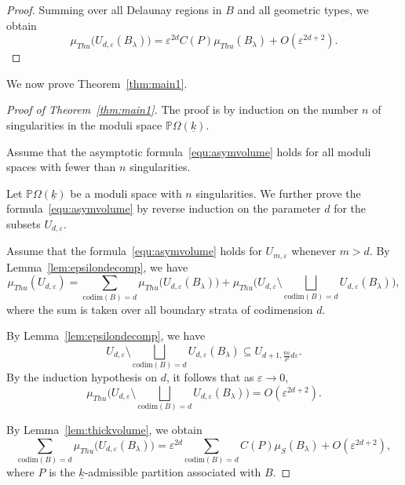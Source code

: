 \documentclass{compositio}
\numberwithin{equation}{section}
\numberwithin{figure}{section}
\theoremstyle{definition}
\theoremstyle{plain}
\begin{document}
{\begin{proof}
    Summing over all Delaunay regions in $B$ and all geometric types, we obtain
    $$
    \mu_{Thu}\big(U_{d,\varepsilon}(B_\lambda)\big) =  \varepsilon^{2d}C(P)\mu_{Thu}(B_{\lambda}) + O(\varepsilon^{2d+2}).
    $$
\end{proof}

We now prove Theorem~\ref{thm:main1}.

\begin{proof}[Proof of Theorem~\ref{thm:main1}]
    The proof is by induction on the number $n$ of singularities in the moduli space $\mathbb{P}\Omega(\underline{k})$.

    Assume that the asymptotic formula~\eqref{equ:asymvolume} holds for all moduli spaces with fewer than $n$ singularities.

    Let $\mathbb{P}\Omega(\underline{k})$ be a moduli space with $n$ singularities. We further prove the formula~\eqref{equ:asymvolume} by reverse induction on the parameter $d$ for the subsets $U_{d,\varepsilon}$.

    Assume that the formula~\eqref{equ:asymvolume} holds for $U_{m,\varepsilon}$ whenever $m > d$. By Lemma~\ref{lem:epsilondecomp}, we have
    \begin{equation}\label{equ:1}
        \mu_{Thu}(U_{d,\varepsilon}) = \sum\limits_{\mathrm{codim}(B) = d}\mu_{Thu}\big(U_{d,\varepsilon}(B_\lambda)\big) + \mu_{Thu}\Big( U_{d,\varepsilon}\setminus\underset{\mathrm{codim}(B)=d}{\bigsqcup}U_{d,\varepsilon}(B_\lambda)\Big),
    \end{equation}
    where the sum is taken over all boundary strata of codimension $d$.

    By Lemma~\ref{lem:epsilondecomp}, we have
    $$U_{d,\varepsilon}\setminus \underset{\mathrm{codim}(B)=d}{\bigsqcup} U_{d,\varepsilon}(B_\lambda)\subseteq U_{d + 1,\frac{6n}{\delta^2} d\varepsilon}.$$
    By the induction hypothesis on $d$, it follows that as $\varepsilon\to 0$, 
    \begin{equation}\label{equ:2}
            \mu_{Thu}\Big( U_{d,\varepsilon}\setminus\underset{\mathrm{codim}(B)=d}{\bigsqcup}U_{d,\varepsilon}(B_\lambda)\Big) = O(\varepsilon^{2d+2}).
    \end{equation}

    By Lemma~\ref{lem:thickvolume}, we obtain
    \begin{equation}\label{equ:3}
        \sum\limits_{\mathrm{codim}(B) = d}\mu_{Thu}\big(U_{d,\varepsilon}(B_\lambda)\big)  = \varepsilon^{2d}\sum\limits_{\mathrm{codim}(B) = d}C(P)\mu_{S}(B_{\lambda}) + O(\varepsilon^{2d + 2}),
    \end{equation}
    where $P$ is the $\underline{k}$-admissible partition associated with $B$.


\end{proof}}
\end{document}
